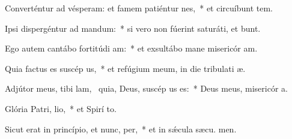 \item Converténtur ad vésperam: et famem patiéntur  nes,~* et circuíbunt tem.
\item Ipsi dispergéntur ad mandum:~* si vero non fúerint saturáti, et bunt.
\item Ego autem cantábo fortitúdi am:~* et exsultábo mane misericór am.
\item Quia factus es suscép us,~* et refúgium meum, in die tribulati æ.
\item Adjútor meus, tibi lam,~\pscross{} quia, Deus, suscép us es:~* Deus meus, misericór a.
\item Glória Patri,  lio,~* et Spirí to.
\item Sicut erat in princípio, et nunc,  per,~* et in sǽcula sæcu. men.
